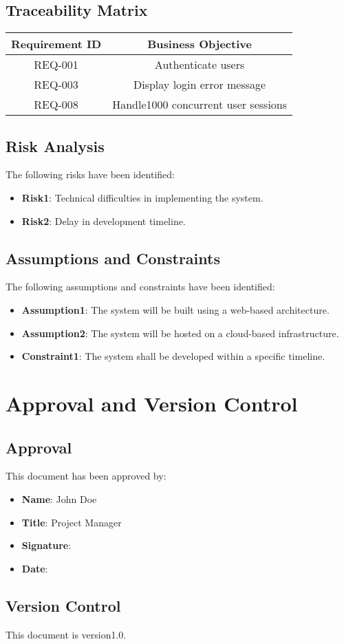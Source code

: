 \documentclass{article}
\begin{document}
\subsection{Traceability Matrix}

\begin{tabular}{|c|c|}
\hline
Requirement ID & Business Objective \\
\hline
REQ-001 & Authenticate users \\
REQ-003 & Display login error message \\
REQ-008 & Handle1000 concurrent user sessions \\
\hline
\end{tabular}

\subsection{Risk Analysis}

The following risks have been identified:

\begin{itemize}
 \item \textbf{Risk1}: Technical difficulties in implementing the system.
 \item \textbf{Risk2}: Delay in development timeline.
\end{itemize}

\subsection{Assumptions and Constraints}

The following assumptions and constraints have been identified:

\begin{itemize}
 \item \textbf{Assumption1}: The system will be built using a web-based architecture.
 \item \textbf{Assumption2}: The system will be hosted on a cloud-based infrastructure.
 \item \textbf{Constraint1}: The system shall be developed within a specific timeline.
\end{itemize}

\section{Approval and Version Control}

\subsection{Approval}

This document has been approved by:

\begin{itemize}
 \item \textbf{Name}: John Doe
 \item \textbf{Title}: Project Manager
 \item \textbf{Signature}: 
 \item \textbf{Date}: 
\end{itemize}

\subsection{Version Control}

This document is version1.0.
\end{document}
